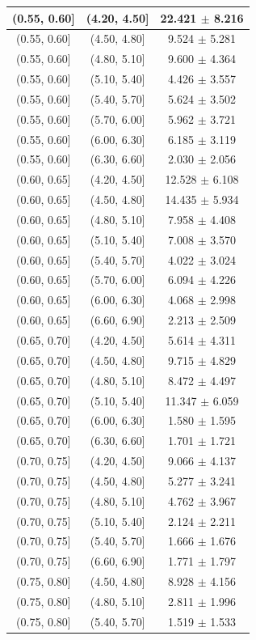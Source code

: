 \begin{longtable}{|c|c|c|}
\hline
(0.55, 0.60] & (4.20, 4.50] & 22.421 $\pm$ 8.216 \\ 
\hline
(0.55, 0.60] & (4.50, 4.80] & 9.524 $\pm$ 5.281 \\ 
\hline
(0.55, 0.60] & (4.80, 5.10] & 9.600 $\pm$ 4.364 \\ 
\hline
(0.55, 0.60] & (5.10, 5.40] & 4.426 $\pm$ 3.557 \\ 
\hline
(0.55, 0.60] & (5.40, 5.70] & 5.624 $\pm$ 3.502 \\ 
\hline
(0.55, 0.60] & (5.70, 6.00] & 5.962 $\pm$ 3.721 \\ 
\hline
(0.55, 0.60] & (6.00, 6.30] & 6.185 $\pm$ 3.119 \\ 
\hline
(0.55, 0.60] & (6.30, 6.60] & 2.030 $\pm$ 2.056 \\ 
\hline
(0.60, 0.65] & (4.20, 4.50] & 12.528 $\pm$ 6.108 \\ 
\hline
(0.60, 0.65] & (4.50, 4.80] & 14.435 $\pm$ 5.934 \\ 
\hline
(0.60, 0.65] & (4.80, 5.10] & 7.958 $\pm$ 4.408 \\ 
\hline
(0.60, 0.65] & (5.10, 5.40] & 7.008 $\pm$ 3.570 \\ 
\hline
(0.60, 0.65] & (5.40, 5.70] & 4.022 $\pm$ 3.024 \\ 
\hline
(0.60, 0.65] & (5.70, 6.00] & 6.094 $\pm$ 4.226 \\ 
\hline
(0.60, 0.65] & (6.00, 6.30] & 4.068 $\pm$ 2.998 \\ 
\hline
(0.60, 0.65] & (6.60, 6.90] & 2.213 $\pm$ 2.509 \\ 
\hline
(0.65, 0.70] & (4.20, 4.50] & 5.614 $\pm$ 4.311 \\ 
\hline
(0.65, 0.70] & (4.50, 4.80] & 9.715 $\pm$ 4.829 \\ 
\hline
(0.65, 0.70] & (4.80, 5.10] & 8.472 $\pm$ 4.497 \\ 
\hline
(0.65, 0.70] & (5.10, 5.40] & 11.347 $\pm$ 6.059 \\ 
\hline
(0.65, 0.70] & (6.00, 6.30] & 1.580 $\pm$ 1.595 \\ 
\hline
(0.65, 0.70] & (6.30, 6.60] & 1.701 $\pm$ 1.721 \\ 
\hline
(0.70, 0.75] & (4.20, 4.50] & 9.066 $\pm$ 4.137 \\ 
\hline
(0.70, 0.75] & (4.50, 4.80] & 5.277 $\pm$ 3.241 \\ 
\hline
(0.70, 0.75] & (4.80, 5.10] & 4.762 $\pm$ 3.967 \\ 
\hline
(0.70, 0.75] & (5.10, 5.40] & 2.124 $\pm$ 2.211 \\ 
\hline
(0.70, 0.75] & (5.40, 5.70] & 1.666 $\pm$ 1.676 \\ 
\hline
(0.70, 0.75] & (6.60, 6.90] & 1.771 $\pm$ 1.797 \\ 
\hline
(0.75, 0.80] & (4.50, 4.80] & 8.928 $\pm$ 4.156 \\ 
\hline
(0.75, 0.80] & (4.80, 5.10] & 2.811 $\pm$ 1.996 \\ 
\hline
(0.75, 0.80] & (5.40, 5.70] & 1.519 $\pm$ 1.533 \\ 
\hline
\end{longtable}
